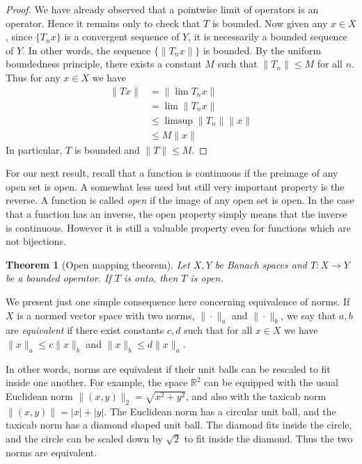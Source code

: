 \documentclass[11pt,oneside]{amsbook}
\newcommand{\RR}{{\mathbb R}}
\theoremstyle{definition}
\theoremstyle{plain}
\newtheorem{thm}{Theorem}[section]
\theoremstyle{definition}
\theoremstyle{remark}
\numberwithin{equation}{section}
\numberwithin{figure}{section}
\begin{document}
\begin{proof}
  We have already observed that a pointwise limit of operators is an operator. Hence it remains only to check that $T$ is bounded. Now given any $x\in X$, since $\{T_nx\}$ is a convergent sequence of $Y$, it is necessarily a bounded sequence of $Y$. In other words, the sequence $\{\|T_nx\|\}$ is bounded. By the uniform boundedness principle, there exists a constant $M$ such that $\|T_n\|\leq M$ for all $n$. Thus for any $x\in X$ we have
  \begin{align*}
    \|Tx\|&=\|\lim T_nx\|\\
          &=\lim\|T_nx\|\\
          &\leq\limsup\|T_n\|\|x\|\\
          &\leq M\|x\|
  \end{align*}
  In particular, $T$ is bounded and $\|T\|\leq M$.
\end{proof}

For our next result, recall that a function is continuous if the preimage of any open set is open. A somewhat less used but still very important property is the reverse. A function is called \emph{open} if the image of any open set is open. In the case that a function has an inverse, the open property simply means that the inverse is continuous. However it is still a valuable property even for functions which are not bijections.

\begin{thm}[Open mapping theorem]
  Let $X,Y$ be Banach spaces and $T\colon X\to Y$ be a bounded operator. If $T$ is onto, then $T$ is open.
\end{thm}

We present just one simple consequence here concerning equivalence of norms. If $X$ is a normed vector space with two norms, $\|\cdot\|_a$ and $\|\cdot\|_b$, we say that $a,b$ are \emph{equivalent} if there exist constants $c,d$ such that for all $x\in X$ we have $\|x\|_a\leq c\|x\|_b$ and $\|x\|_b\leq d\|x\|_a$.

In other words, norms are equivalent if their unit balls can be rescaled to fit inside one another. For example, the space $\RR^2$ can be equipped with the usual Euclidean norm $\|(x,y)\|_2=\sqrt{x^2+y^2}$, and also with the taxicab norm $\|(x,y)\|=|x|+|y|$. The Euclidean norm has a circular unit ball, and the taxicab norm has a diamond shaped unit ball. The diamond fits inside the circle, and the circle can be scaled down by $\sqrt2$ to fit inside the diamond. Thus the two norms are equivalent.
\end{document}
